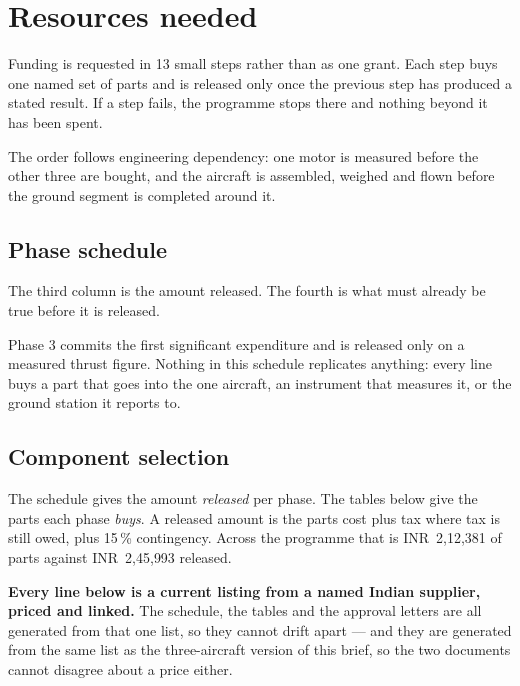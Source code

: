 \documentclass[11pt,a4paper]{article}
\newcommand{\rs}[1]{\mbox{INR~#1}}
\begin{document}
\section{Resources needed}

Funding is requested in 13 small steps rather than as one grant. Each step buys
one named set of parts and is released only once the previous step has produced
a stated result. If a step fails, the programme stops there and nothing beyond
it has been spent.

The order follows engineering dependency: one motor is measured before the
other three are bought, and the aircraft is assembled, weighed and flown before
the ground segment is completed around it.

\subsection{Phase schedule}

The third column is the amount released. The fourth is what must already be
true before it is released.



Phase 3 commits the first significant expenditure and is released only on a
measured thrust figure. Nothing in this schedule replicates anything: every
line buys a part that goes into the one aircraft, an instrument that measures
it, or the ground station it reports to.

\subsection{Component selection}

The schedule gives the amount
\emph{released} per phase. The tables below give the parts each phase
\emph{buys}. A released amount is the parts cost plus tax where tax is still
owed, plus 15\,\% contingency. Across the programme that is \rs{2{,}12{,}381}
of parts against \rs{2{,}45{,}993} released.

\textbf{Every line below is a current listing from a named Indian supplier,
priced and linked.} The schedule, the tables and the approval letters are all
generated from that one list, so they cannot drift apart --- and they are
generated from the same list as the three-aircraft version of this brief, so
the two documents cannot disagree about a price either.
\end{document}

